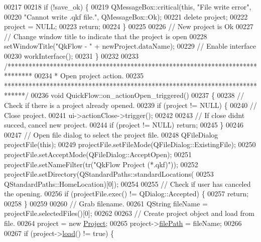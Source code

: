 \begin{DoxyCode}
00217 
00218   \textcolor{keywordflow}{if} (!save\_ok) \{
00219     QMessageBox::critical(\textcolor{keyword}{this}, \textcolor{stringliteral}{"File write error"},
00220                           \textcolor{stringliteral}{"Cannot write .qkf file."}, QMessageBox::Ok);
00221     \textcolor{keyword}{delete} project;
00222     project = NULL;
00223     \textcolor{keywordflow}{return};
00224   \}
00225 
00226   \textcolor{comment}{// New project is Ok}
00227   \textcolor{comment}{// Change window title to indicate that the project is open}
00228   setWindowTitle(\textcolor{stringliteral}{"QkFlow - "} + newProject.dataName);
00229   \textcolor{comment}{// Enable interface}
00230   workInterface();
00231 \}
00232 
00233 \textcolor{comment}{/*******************************************************************************}
00234 \textcolor{comment}{ * Open project action.}
00235 \textcolor{comment}{ ******************************************************************************/}
00236 \textcolor{keywordtype}{void} QuickFlow::on\_actionOpen\_triggered()
00237 \{
00238   \textcolor{comment}{// Check if there is a project already opened.}
00239   \textcolor{keywordflow}{if} (project != NULL) \{
00240     \textcolor{comment}{// Close project.}
00241     ui->actionClose->trigger();
00242 
00243     \textcolor{comment}{// If close didnt succed, cancel new project.}
00244     \textcolor{keywordflow}{if} (project != NULL) \textcolor{keywordflow}{return};
00245   \}
00246 
00247   \textcolor{comment}{// Open file dialog to select the project file.}
00248   QFileDialog projectFile(\textcolor{keyword}{this});
00249   projectFile.setFileMode(QFileDialog::ExistingFile);
00250   projectFile.setAcceptMode(QFileDialog::AcceptOpen);
00251   projectFile.setNameFilter(tr(\textcolor{stringliteral}{"QkFlow Project (*.qkf)"}));
00252   projectFile.setDirectory(QStandardPaths::standardLocations(
00253                              QStandardPaths::HomeLocation)[0]);
00254 
00255   \textcolor{comment}{// Check if user has canceled the opening.}
00256   \textcolor{keywordflow}{if} (projectFile.exec() != QDialog::Accepted) \{
00257     \textcolor{keywordflow}{return};
00258   \}
00259 
00260   \textcolor{comment}{// Grab filename.}
00261   QString fileName = projectFile.selectedFiles()[0];
00262 
00263   \textcolor{comment}{// Create project object and load from file.}
00264   project = \textcolor{keyword}{new} \hyperlink{class_project}{Project};
00265   project->\hyperlink{class_project_a79f30adcefd0b72bd4ac7db724bc9531}{filePath} = fileName;
00266 
00267   \textcolor{keywordflow}{if} (project->\hyperlink{class_project_a1e373892a0383371132ce68fa5f8813d}{load}() != \textcolor{keyword}{true}) \{

\end{DoxyCode}
